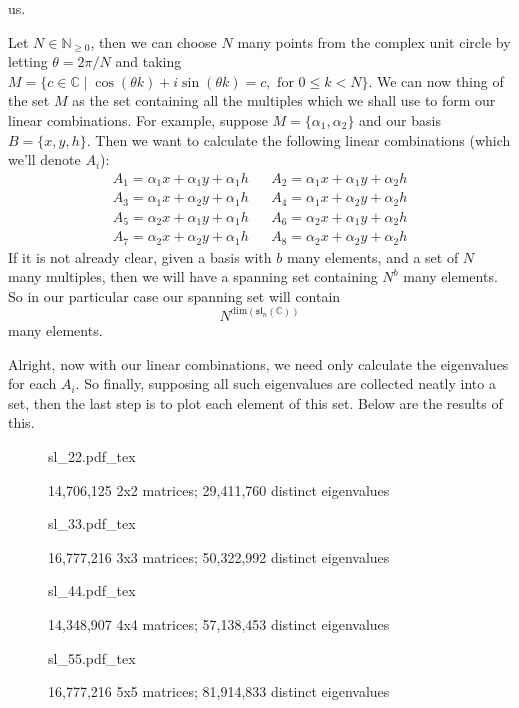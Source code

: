 \documentclass[12pt]{article}
\newcommand{\incfig}[1]{%
    \def\svgwidth{\columnwidth}
    {#1.pdf_tex}
}
\theoremstyle{definition}
\theoremstyle{definition}
\begin{document}
        us.\par\hspace{4mm} Let $N\in\mathbb{N}_{\geq 0}$, then we can choose $N$ 
        many points from the complex unit circle by letting $\theta
        = 2\pi/N$ and taking $M=\{c\in\mathbb{C}\mid \cos(\theta
        k)+i\sin(\theta k)=c, \text{ for }0\leq k<N\}$. We can now thing of the set 
        $M$ as the set containing all the multiples which we shall use to form our 
        linear combinations. For example, suppose $M=\{\alpha_1, \alpha_2\}$ and 
        our basis $B=\{x, y, h\}$. Then we want to calculate the following linear 
        combinations (which we'll denote $A_i$):
        \begin{align*}
            &A_{1}=\alpha_1x+\alpha_1y+\alpha_1h& 
            &A_{2}=\alpha_1x+\alpha_1y+\alpha_2h& \\ 
            &A_{3}=\alpha_1x+\alpha_2y+\alpha_1h& 
            &A_{4}=\alpha_1x+\alpha_2y+\alpha_2h& \\ 
            &A_5=\alpha_2x+\alpha_1y+\alpha_1h&   
            &A_6=\alpha_2x+\alpha_1y+\alpha_2h& \\
            &A_7=\alpha_2x+\alpha_2y+\alpha_1h&   &A_8=\alpha_2x+\alpha_2y+\alpha_2h&
        \end{align*}
        If it is not already clear, given a basis with $b$ many elements, and a 
        set of $N$ many multiples, then we will have a spanning set containing 
        $N^b$ many elements. So in our particular case our spanning set will contain
        \begin{equation*}
            N^{\text{dim}(\mathfrak{sl}_n(\mathbb{C}))}
        \end{equation*}
        many elements.\par\hspace{4mm} Alright, now with our linear combinations, 
        we need only calculate the eigenvalues for each $A_i$. So finally, supposing 
        all such eigenvalues are collected neatly into a set, then the last step is 
        to plot each element of this set. Below are the results of this.\newpage
        \begin{figure}[htp!]
            \centering
            \incfig{sl_22}
            \caption{14,706,125 2x2 matrices; 29,411,760 distinct eigenvalues}
            \label{fig:14,706,125 2x2 matrices}
        \end{figure}\newpage
        \begin{figure}[htb!]
            \centering
            \incfig{sl_33}
            \caption{16,777,216 3x3 matrices; 50,322,992 distinct eigenvalues}
            \label{fig:2}
        \end{figure}\newpage
        \begin{figure}[htb!]
            \centering
            \incfig{sl_44}
            \caption{14,348,907 4x4 matrices; 57,138,453 distinct eigenvalues}
            \label{fig:}
        \end{figure}\newpage
        \begin{figure}[htb!]
            \centering
            \incfig{sl_55}
            \caption{16,777,216 5x5 matrices; 81,914,833 distinct eigenvalues}
            \label{fig:}
        \end{figure}\newpage
\end{document}
